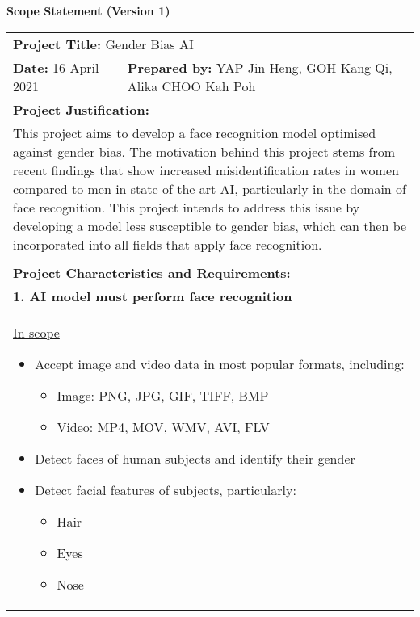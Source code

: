 \begin{center}
    \textbf{Scope Statement (Version 1)}
\end{center}

\begin{longtable}{ | p{} l | }
    \hline
    \multicolumn{2}{|l|}{\textbf{Project Title:} Gender Bias AI} \\
    \textbf{Date:} 16 April 2021 &
    \textbf{Prepared by:} YAP Jin Heng, GOH Kang Qi, Alika CHOO Kah Poh \\
    \hline
    \multicolumn{2}{|l|}{\textbf{Project Justification:}} \\
    \multicolumn{2}{|p{\textwidth}|}{This project aims to develop a face recognition model optimised against gender bias. The motivation behind this project stems from recent findings that show increased misidentification rates in women compared to men in state-of-the-art AI, particularly in the domain of face recognition. This project intends to address this issue by developing a model less susceptible to gender bias, which can then be incorporated into all fields that apply face recognition.} \\
    & \\
    \hline
    \multicolumn{2}{|p{\textwidth}|}{\textbf{Project Characteristics and Requirements:}} \\
    \multicolumn{2}{|p{\textwidth}|}{\textbf{1. AI model must perform face recognition}} \\
    \multicolumn{2}{|p{\textwidth}|}{\hspace{0.6cm}\underline{In scope}
        \begin{itemize}
            \item Accept image and video data in most popular formats, including:
                \begin{itemize}
                    \item Image: PNG, JPG, GIF, TIFF, BMP
                    \item Video: MP4, MOV, WMV, AVI, FLV
                \end{itemize}
            \item Detect faces of human subjects and identify their gender
            \item Detect facial features of subjects, particularly:
                \begin{itemize}
                    \item Hair
                    \item Eyes
                    \item Nose

\end{itemize}
\end{itemize}}
\end{longtable}
